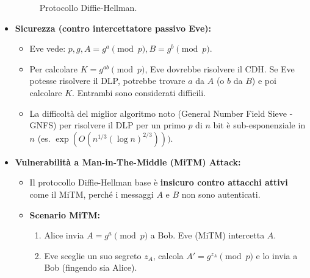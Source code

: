 \documentclass{article}
\begin{document}
\begin{itemize}
\begin{figure}[H]
            \caption{Protocollo Diffie-Hellman.}
            \label{fig:diffie_hellman}
        \end{figure}
    \item \textbf{Sicurezza (contro intercettatore passivo Eve):}
        \begin{itemize}
            \item Eve vede: $p, g, A=g^a \pmod{p}, B=g^b \pmod{p}$.
            \item Per calcolare $K = g^{ab} \pmod{p}$, Eve dovrebbe risolvere il CDH. Se Eve potesse risolvere il DLP, potrebbe trovare $a$ da $A$ (o $b$ da $B$) e poi calcolare $K$. Entrambi sono considerati difficili.
            \item La difficoltà del miglior algoritmo noto (General Number Field Sieve - GNFS) per risolvere il DLP per un primo $p$ di $n$ bit è sub-esponenziale in $n$ (es. $\exp(O(n^{1/3} (\log n)^{2/3})))$.
        \end{itemize}
    \item \textbf{Vulnerabilità a Man-in-The-Middle (MiTM) Attack:}
        \begin{itemize}
            \item Il protocollo Diffie-Hellman base è \textbf{insicuro contro attacchi attivi} come il MiTM, perché i messaggi $A$ e $B$ non sono autenticati.
            \item \textbf{Scenario MiTM:}
                \begin{enumerate}
                    \item Alice invia $A = g^a \pmod{p}$ a Bob. Eve (MiTM) intercetta $A$.
                    \item Eve sceglie un suo segreto $z_A$, calcola $A' = g^{z_A} \pmod{p}$ e lo invia a Bob (fingendo sia Alice).

\end{enumerate}
\end{itemize}
\end{itemize}
\end{document}
